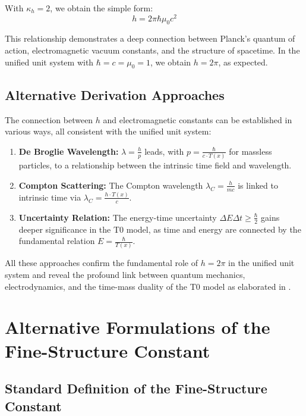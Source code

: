 \documentclass[12pt,a4paper]{article}
\newcommand{\Tfield}{T(x)}
\begin{document}
	With \(\kappa_h = 2\), we obtain the simple form:
	\begin{equation}
		h = 2\pi\hbar \mu_0 c^2
	\end{equation}
	
	This relationship demonstrates a deep connection between Planck's quantum of action, electromagnetic vacuum constants, and the structure of spacetime. In the unified unit system with \(\hbar = c = \mu_0 = 1\), we obtain \(h = 2\pi\), as expected.
	
	\subsection{Alternative Derivation Approaches}
	\label{subsec:alternative_derivations}
	
	The connection between \(h\) and electromagnetic constants can be established in various ways, all consistent with the unified unit system:
	
	\begin{enumerate}
		\item \textbf{De Broglie Wavelength:} \(\lambda = \frac{h}{p}\) leads, with \(p = \frac{\hbar}{c \cdot \Tfield}\) for massless particles, to a relationship between the intrinsic time field and wavelength.
		\item \textbf{Compton Scattering:} The Compton wavelength \(\lambda_C = \frac{h}{mc}\) is linked to intrinsic time via \(\lambda_C = \frac{h \cdot \Tfield}{c}\).
		\item \textbf{Uncertainty Relation:} The energy-time uncertainty \(\Delta E \Delta t \geq \frac{\hbar}{2}\) gains deeper significance in the T0 model, as time and energy are connected by the fundamental relation \(E = \frac{\hbar}{\Tfield}\).
	\end{enumerate}
	
	All these approaches confirm the fundamental role of \(h = 2\pi\) in the unified unit system and reveal the profound link between quantum mechanics, electrodynamics, and the time-mass duality of the T0 model as elaborated in \cite{pascher_zeit_2025}.
	
	\section{Alternative Formulations of the Fine-Structure Constant}
	\label{sec:alternative_alpha}
	
	\subsection{Standard Definition of the Fine-Structure Constant}
	\label{subsec:standard_alpha}
	
\end{document}
